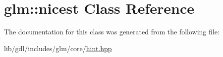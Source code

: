 \hypertarget{classglm_1_1nicest}{}\section{glm\+:\+:nicest Class Reference}
\label{classglm_1_1nicest}


The documentation for this class was generated from the following file\+:\begin{DoxyCompactItemize}
\item 
lib/gdl/includes/glm/core/\hyperlink{hint_8hpp}{hint.\+hpp}\end{DoxyCompactItemize}
